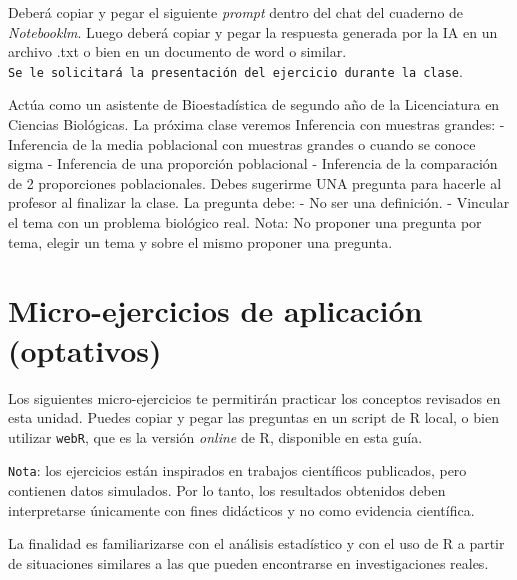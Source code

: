 \documentclass[
  spanish,
  letterpaper,
  DIV=11,
  numbers=noendperiod]{scrreprt}
\newenvironment{Shaded}{\begin{snugshade}}{\end{snugshade}}
\newcommand{\DecValTok}[1]{\textcolor[rgb]{0.68,0.00,0.00}{#1}}
\newcommand{\NormalTok}[1]{\textcolor[rgb]{0.00,0.23,0.31}{#1}}
\newcommand{\SpecialCharTok}[1]{\textcolor[rgb]{0.37,0.37,0.37}{#1}}
\begin{document}
Deberá copiar y pegar el siguiente \emph{prompt} dentro del chat del
cuaderno de \emph{Notebooklm}. Luego deberá copiar y pegar la respuesta
generada por la IA en un archivo .txt o bien en un documento de word o
similar.
\texttt{Se\ le\ solicitará\ la\ presentación\ del\ ejercicio\ durante\ la\ clase}.

\begin{Shaded}
\begin{Highlighting}[]
\NormalTok{Actúa como un asistente de Bioestadística de segundo año de la Licenciatura en Ciencias Biológicas. }
\NormalTok{La próxima clase veremos Inferencia con muestras grandes}\SpecialCharTok{:} 
  \SpecialCharTok{{-}}\NormalTok{ Inferencia de la media poblacional con muestras grandes o cuando se conoce sigma}
  \SpecialCharTok{{-}}\NormalTok{ Inferencia de una proporción poblacional}
  \SpecialCharTok{{-}}\NormalTok{ Inferencia de la comparación de }\DecValTok{2}\NormalTok{ proporciones poblacionales.}
\NormalTok{Debes sugerirme UNA pregunta para hacerle al profesor al finalizar la clase. La pregunta debe}\SpecialCharTok{:}
\SpecialCharTok{{-}}\NormalTok{ No ser una definición.}
\SpecialCharTok{{-}}\NormalTok{ Vincular el tema con un problema biológico real.}
\NormalTok{Nota}\SpecialCharTok{:}\NormalTok{ No proponer una pregunta por tema, elegir un tema y sobre el mismo proponer una pregunta.}
\end{Highlighting}
\end{Shaded}

\section{Micro-ejercicios de aplicación
(optativos)}\label{micro-ejercicios-de-aplicaciuxf3n-optativos-5}

Los siguientes micro-ejercicios te permitirán practicar los conceptos
revisados en esta unidad. Puedes copiar y pegar las preguntas en un
script de R local, o bien utilizar \texttt{webR}, que es la versión
\emph{online} de R, disponible en esta guía.

\texttt{Nota}: los ejercicios están inspirados en trabajos científicos
publicados, pero contienen datos simulados. Por lo tanto, los resultados
obtenidos deben interpretarse únicamente con fines didácticos y no como
evidencia científica.

La finalidad es familiarizarse con el análisis estadístico y con el uso
de R a partir de situaciones similares a las que pueden encontrarse en
investigaciones reales.
\end{document}
